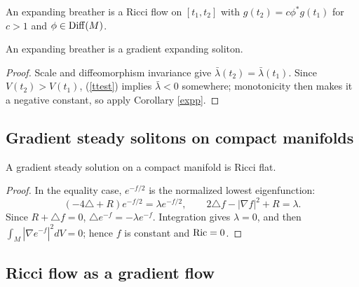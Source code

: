 \begin{definition}
  \label{def:kl-rescaled-invariant-expanding-breather-definition}
An expanding breather is a Ricci flow on $[t_1,t_2]$ with
$g(t_2)=c\phi^*g(t_1)$ for $c>1$ and $\phi\in\operatorname{Diff}(M)$.
\end{definition}

\begin{proposition}
  \label{prop:kl-rescaled-invariant-rigidity-expanding-breathers}
An expanding breather is a gradient expanding soliton.
\end{proposition}
\begin{proof}
\sketch
Scale and diffeomorphism invariance give $\bar\lambda(t_2)=\bar\lambda(t_1)$.
Since $V(t_2)>V(t_1)$, (\ref{ttest}) implies $\bar\lambda<0$ somewhere; monotonicity
then makes it a negative constant, so apply Corollary \ref{expp}.
\end{proof}

\subsection{Gradient steady solitons on compact manifolds}

\begin{proposition}
  \label{prop:kl-gradient-steady-solitons-compact-manifolds-compactness-ricci-solitons}
A gradient steady solution on a compact manifold is Ricci flat.
\end{proposition}
\begin{proof}
\sketch
In the equality case, $e^{-f/2}$ is the normalized lowest eigenfunction:
\[(-4\triangle+R)e^{-f/2}=\lambda e^{-f/2},\qquad2\triangle f-|\nabla f|^2+R=\lambda.\]
Since $R+\triangle f=0$, $\triangle e^{-f}=-\lambda e^{-f}$. Integration gives
$\lambda=0$, and then $\int_M|\nabla e^{-f}|^2dV=0$; hence $f$ is constant and
$\operatorname{Ric}=0$.
\end{proof}

\subsection{Ricci flow as a gradient flow}

